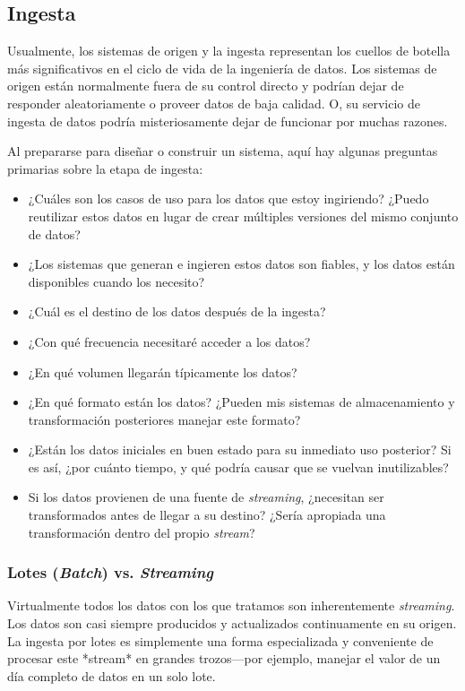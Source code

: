 \documentclass[12pt]{book}
\begin{document}
\subsection{Ingesta}
Usualmente, los sistemas de origen y la ingesta representan los cuellos de botella más significativos en el ciclo de vida de la ingeniería de datos. Los sistemas de origen están normalmente fuera de su control directo y podrían dejar de responder aleatoriamente o proveer datos de baja calidad. O, su servicio de ingesta de datos podría misteriosamente dejar de funcionar por muchas razones.

Al prepararse para diseñar o construir un sistema, aquí hay algunas preguntas primarias sobre la etapa de ingesta:
\begin{itemize}
    \item ¿Cuáles son los casos de uso para los datos que estoy ingiriendo? ¿Puedo reutilizar estos datos en lugar de crear múltiples versiones del mismo conjunto de datos?
    \item ¿Los sistemas que generan e ingieren estos datos son fiables, y los datos están disponibles cuando los necesito?
    \item ¿Cuál es el destino de los datos después de la ingesta?
    \item ¿Con qué frecuencia necesitaré acceder a los datos?
    \item ¿En qué volumen llegarán típicamente los datos?
    \item ¿En qué formato están los datos? ¿Pueden mis sistemas de almacenamiento y transformación posteriores manejar este formato?
    \item ¿Están los datos iniciales en buen estado para su inmediato uso posterior? Si es así, ¿por cuánto tiempo, y qué podría causar que se vuelvan inutilizables?
    \item Si los datos provienen de una fuente de \textit{streaming}, ¿necesitan ser transformados antes de llegar a su destino? ¿Sería apropiada una transformación dentro del propio \textit{stream}?
\end{itemize}

\subsubsection{Lotes (\textit{Batch}) vs. \textit{Streaming}}
Virtualmente todos los datos con los que tratamos son inherentemente \textit{streaming}. Los datos son casi siempre producidos y actualizados continuamente en su origen. La ingesta por lotes es simplemente una forma especializada y conveniente de procesar este *stream* en grandes trozos—por ejemplo, manejar el valor de un día completo de datos en un solo lote.
\end{document}
